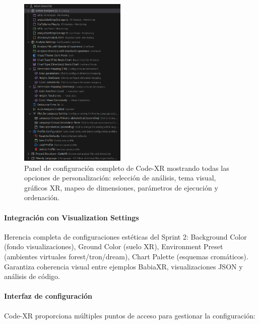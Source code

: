 \documentclass[a4paper, 12pt]{book}
\begin{document}
\begin{figure}[H]
\centering
\includegraphics[width=0.45\textwidth]{img/panel-configuracion-completo.png}
\caption{Panel de configuración completo de Code-XR mostrando todas las opciones de personalización: selección de análisis, tema visual, gráficos XR, mapeo de dimensiones, parámetros de ejecución y ordenación.}
\label{fig:panel-configuracion-completo}
\end{figure}

\paragraph{Integración con Visualization Settings}
Herencia completa de configuraciones estéticas del Sprint 2: Background Color (fondo visualizaciones), Ground Color (suelo XR), Environment Preset (ambientes virtuales forest/tron/dream), Chart Palette (esquemas cromáticos). Garantiza coherencia visual entre ejemplos BabiaXR, visualizaciones JSON y análisis de código.

\paragraph{Interfaz de configuración}
Code-XR proporciona múltiples puntos de acceso para gestionar la configuración:
\end{document}
